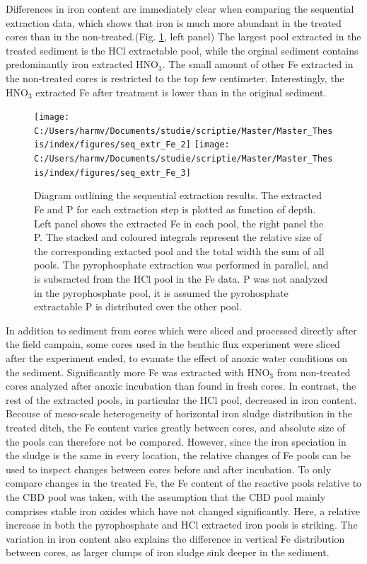 \documentclass[a4paper,11pt]{article}
\begin{document}
Differences in iron content are immediately clear when comparing the sequential extraction data, which shows that iron is much more abundant in the treated cores than in the non-treated.(Fig. \ref{fig:seq}, left panel) The largest pool extracted in the treated sediment is the HCl extractable pool, while the orginal sediment contains predominantly iron extracted HNO\(_3\). The small amount of other Fe extracted in the non-treated cores is restricted to the top few centimeter. Interestingly, the HNO\(_3\) extracted Fe after treatment is lower than in the original sediment.
\begin{figure}

{\centering \texttt{[image: C:/Users/harmv/Documents/studie/scriptie/Master/Master\_Thesis/index/figures/seq\_extr\_Fe\_2]} \texttt{[image: C:/Users/harmv/Documents/studie/scriptie/Master/Master\_Thesis/index/figures/seq\_extr\_Fe\_3]} 

}

\caption{Diagram outlining the sequential extraction results. The extracted Fe and P for each extraction step is plotted as function of depth. Left panel shows the extracted Fe in each pool, the right panel the P.  The stacked and coloured integrals represent the relative size of the corresponding extacted pool and the total width the sum of all pools. The pyrophosphate extraction was performed in parallel, and is subsracted from the HCl pool in the Fe data. P was not analyzed in the pyrophosphate pool, it is assumed the pyrohosphate extractable P is distributed over the other pool.    }\label{fig:seq}
\end{figure}
In addition to sediment from cores which were sliced and processed directly after the field campain, some cores used in the benthic flux experiment were sliced after the experiment ended, to evauate the effect of anoxic water conditions on the sediment. Significantly more Fe was extracted with HNO\(_3\) from non-treated cores analyzed after anoxic incubation than found in fresh cores. In contrast, the rest of the extracted pools, in particular the HCl pool, decreased in iron content. Becouse of meso-scale heterogeneity of horizontal iron sludge distribution in the treated ditch, the Fe content varies greatly between cores, and absolute size of the pools can therefore not be compared. However, since the iron speciation in the sludge is the same in every location, the relative changes of Fe pools can be used to inspect changes between cores before and after incubation. To only compare changes in the treated Fe, the Fe content of the reactive pools relative to the CBD pool was taken, with the assumption that the CBD pool mainly comprises stable iron oxides which have not changed significantly. Here, a relative increase in both the pyrophosphate and HCl extracted iron pools is striking. The variation in iron content also explains the difference in vertical Fe distribution between cores, as larger clumps of iron sludge sink deeper in the sediment.
\end{document}
